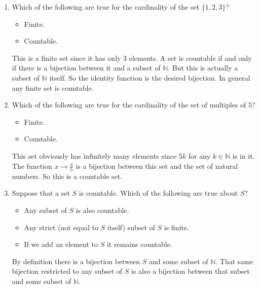 \documentclass[11pt,preview]{standalone} %
\begin{document}


\begin{enumerate}
	\item Which of the following are true for the cardinality of the set $\{1,2,3\}$?
	\begin{Multi}
	\begin{itemize}
		\TrueChoice\item Finite.
		\TrueChoice\item Countable.
	\end{itemize}
	\Solution This is a finite set since it has only 3 elements. A set is countable if and only if there is a bijection between it and a subset of $\mathbb{N}$. But this is actually a subset of $\mathbb{N}$ itself. So the identity function is the desired bijection. In general any finite set is countable.
	\end{Multi}
	
	\item Which of the following are true for the cardinality of the set of multiples of $5$?
	\begin{Multi}
	\begin{itemize}
		\FalseChoice\item Finite.
		\TrueChoice\item Countable.
	\end{itemize}
	\Solution This set obviously has infinitely many elements since $5k$ for any $k\in\mathbb{N}$ is in it. The function $x\to \frac{x}{5}$ is a bijection between this set and the set of natural numbers. So this is a countable set.
	\end{Multi}


	\item Suppose that a set $S$ is countable. Which of the following are true about $S$?
	\begin{Multi}
	\begin{itemize}
		\TrueChoice\item Any subset of $S$ is also countable.
		\FalseChoice\item Any strict (not equal to $S$ itself) subset of $S$ is finite.
		\TrueChoice\item  If we add an element to $S$ it remains countable.
	\end{itemize}
	\Solution By definition there is a bijection between $S$ and some subset of $\mathbb{N}$. That same bijection restricted to any subset of $S$ is also a bijection between that subset and some subset of $\mathbb{N}$.
	

\end{Multi}
\end{enumerate}
\end{document}
